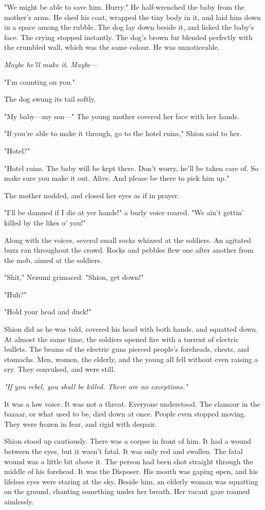 "We might be able to save him. Hurry." He half-wrenched the baby from
the mother's arms. He shed his coat, wrapped the tiny body in it, and
laid him down in a space among the rubble. The dog lay down beside it,
and licked the baby's face. The crying stopped instantly. The dog's
brown fur blended perfectly with the crumbled wall, which was the same
colour. He was unnoticeable.

\emph{Maybe he'll make it. Maybe---}

"I'm counting on you."

The dog swung its tail softly.

"My baby---my son---" The young mother covered her face with her hands.

"If you're able to make it through, go to the hotel ruins," Shion said
to her.

"Hotel?"

"Hotel ruins. The baby will be kept there. Don't worry, he'll be taken
care of. So make sure you make it out. Alive. And please be there to
pick him up."

The mother nodded, and closed her eyes as if in prayer.

"I'll be damned if I die at yer hands!" a burly voice roared. "We ain't
gettin' killed by the likes o' you!"

Along with the voices, several small rocks whizzed at the soldiers. An
agitated buzz ran throughout the crowd. Rocks and pebbles flew one after
another from the mob, aimed at the soldiers.

"Shit," Nezumi grimaced. "Shion, get down!"

"Huh?"

"Hold your head and duck!"

Shion did as he was told, covered his head with both hands, and squatted
down. At almost the same time, the soldiers opened fire with a torrent
of electric bullets. The beams of the electric guns pierced people's
foreheads, chests, and stomachs. Men, women, the elderly, and the young
all fell without even raising a cry. They convulsed, and were still.

\emph{"If you rebel, you shall be killed. There are no exceptions."}

It was a low voice. It was not a threat. Everyone understood. The
clamour in the bazaar, or what used to be, died down at once. People
even stopped moving. They were frozen in fear, and rigid with despair.

Shion stood up cautiously. There was a corpse in front of him. It had a
wound between the eyes, but it wasn't fatal. It was only red and
swollen. The fatal wound was a little bit above it. The person had been
shot straight through the middle of his forehead. It was the Disposer.
His mouth was gaping open, and his lifeless eyes were staring at the
sky. Beside him, an elderly woman was squatting on the ground, chanting
something under her breath. Her vacant gaze roamed aimlessly.

